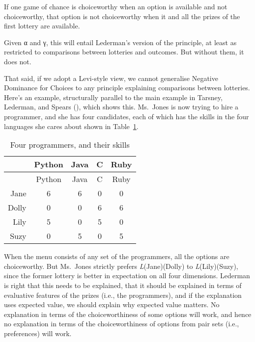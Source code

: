 \documentclass[
  11pt,
  letterpaper,
  DIV=11,
  numbers=noendperiod,
  twoside]{scrartcl}
\providecommand{\tightlist}{%
  \setlength{\itemsep}{0pt}\setlength{\parskip}{0pt}}
\begin{document}
\begin{description}
\tightlist
\item[Negative Dominance for Choices]
If one game of chance is choiceworthy when an option is available and
not choiceworthy, that option is not choiceworthy when it and all the
prizes of the first lottery are available.
\end{description}

Given α and γ, this will entail Lederman's version of the principle, at
least as restricted to comparisons between lotteries and outcomes. But
without them, it does not.

That said, if we adopt a Levi-style view, we cannot generalise Negative
Dominance for Choices to any principle explaining comparisons between
lotteries. Here's an example, structurally parallel to the main example
in Tarsney, Lederman, and Spears
(), which shows this.
Ms.~Jones is now trying to hire a programmer, and she has four
candidates, each of which has the skills in the four languages she cares
about shown in Table~\ref{tbl-programmers}.

\begin{longtable}[]{@{}rcccc@{}}
\caption{Four programmers, and their
skills}\label{tbl-programmers}\tabularnewline
\toprule\noalign{}
& Python & Java & C & Ruby \\
\midrule\noalign{}
\endfirsthead
\toprule\noalign{}
& Python & Java & C & Ruby \\
\midrule\noalign{}
\endhead
\bottomrule\noalign{}
\endlastfoot
Jane & 6 & 6 & 0 & 0 \\
Dolly & 0 & 0 & 6 & 6 \\
Lily & 5 & 0 & 5 & 0 \\
Suzy & 0 & 5 & 0 & 5 \\
\end{longtable}

When the menu consists of any set of the programmers, all the options
are choiceworthy. But Ms.~Jones strictly prefers \emph{L}(Jane)(Dolly)
to \emph{L}(Lily)(Suzy), since the former lottery is better in
expectation on all four dimensions. Lederman is right that this needs to
be explained, that it should be explained in terms of evaluative
features of the prizes (i.e., the programmers), and if the explanation
uses expected value, we should explain why expected value matters. No
explanation in terms of the choiceworthiness of some options will work,
and hence no explanation in terms of the choiceworthiness of options
from pair sets (i.e., preferences) will work.
\end{document}
